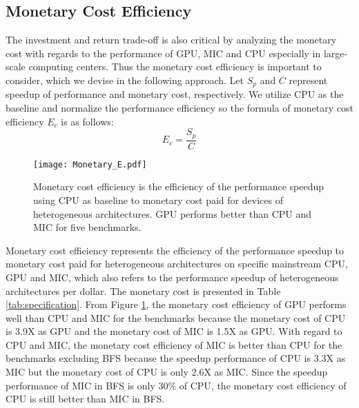 \subsection{Monetary Cost Efficiency} 
The investment and return trade-off is also critical by analyzing the monetary cost with regards to 
the performance of GPU, MIC and CPU especially in large-scale computing centers.
Thus the monetary cost efficiency is important to consider, which we devise in the following approach. 
Let $S_{p}$ and $C$ represent speedup of performance and monetary cost, respectively. We utilize CPU as the baseline and normalize the performance efficiency so the formula of monetary cost efficiency $E_{c}$ is as follows:
\begin{equation}\label{equ:monetaryE}
  {E_{c}} = \frac{S_{p}}{C}
\end{equation}

    \begin{figure}[h!]
  \centering
  \begin{minipage}{0.5\textwidth}
    \centering
   \centering
     \texttt{[image: Monetary\_E.pdf]}    
\caption{Monetary cost efficiency is the efficiency of the performance speedup using CPU as baseline to monetary cost paid for devices of heterogeneous architectures. GPU performs better than CPU and MIC for five benchmarks.}
\label{fig:monetaryE}
\end{minipage}%
\end{figure}

Monetary cost efficiency represents the efficiency of the performance speedup to monetary cost paid for heterogeneous architectures on specific mainstream CPU, GPU and MIC, which also refers to the performance speedup of heterogeneous architectures per dollar. The monetary cost is presented in Table \ref{tab:specification}. From Figure \ref{fig:monetaryE}, the monetary cost efficiency of GPU performs well than CPU and MIC for the benchmarks because the monetary cost of CPU is 3.9X as GPU and the monetary cost of MIC is 1.5X as GPU. With regard to CPU and MIC, the monetary cost efficiency of MIC is better than CPU for the benchmarks excluding BFS because the speedup performance of CPU is 3.3X as MIC but the monetary cost of CPU is only 2.6X as MIC. Since the speedup performance of MIC in BFS is only 30\% of CPU, the monetary cost efficiency of CPU is still better than MIC in BFS.




